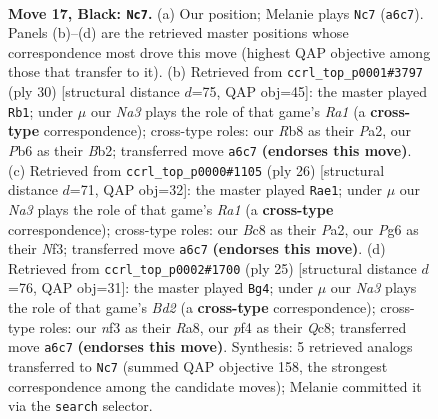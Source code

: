 \documentclass[11pt]{article}
\begin{document}
\begin{figure}[p]\centering
\begin{subfigure}{0.46\textwidth}\centering
\resizebox{\linewidth}{!}{%
\newchessgame
\chessboard[
  setfen={1rbq1r1k/p3b2p/npp2np1/3p1p2/3P1P2/P4NP1/QP1NP1BP/R1B1R1K1 b - - 3 17},
  showmover=false,
  pgfstyle=straightmove, color=movearrow, markmove={a6-c7}
]}
\caption{}
\end{subfigure}\hfill
\begin{subfigure}{0.46\textwidth}\centering
\resizebox{\linewidth}{!}{%
\newchessgame
\chessboard[
  setfen={r2qr1k1/p4pbn/2pp1np1/5b1p/2PPp3/2N1P2P/PB1NBPP1/R2QR1K1 w - - 2 16},
  showmover=false,
  pgfstyle=straightmove, color=movearrow, markmove={a1-b1}
]}
\caption{}
\end{subfigure}
\\[4pt]
\begin{subfigure}{0.46\textwidth}\centering
\resizebox{\linewidth}{!}{%
\newchessgame
\chessboard[
  setfen={r1b1r1k1/pp1nqp1p/3p1np1/2pP4/2P5/2NBPN1P/PPQ3P1/R4RK1 w - - 3 14},
  showmover=false,
  pgfstyle=straightmove, color=movearrow, markmove={a1-e1}
]}
\caption{}
\end{subfigure}\hfill
\begin{subfigure}{0.46\textwidth}\centering
\resizebox{\linewidth}{!}{%
\newchessgame
\chessboard[
  setfen={r1q2rk1/1ppb1pb1/2np1npp/4p3/1PP5/1QNP1NP1/4PPBP/1RB2RK1 b - - 1 13},
  showmover=false,
  pgfstyle=straightmove, color=movearrow, markmove={d7-g4}
]}
\caption{}
\end{subfigure}
\caption{\textbf{Move 17, Black: \texttt{Nc7}.} (a) Our position; Melanie plays \texttt{Nc7} (\texttt{a6c7}). Panels (b)--(d) are the retrieved master positions whose correspondence most drove this move (highest QAP objective among those that transfer to it). (b) Retrieved from \texttt{ccrl\_top\_p0001\#3797} (ply 30) [structural distance $d$=75, QAP obj=45]: the master played \texttt{Rb1}; under $\mu$ our \emph{Na3} plays the role of that game's \emph{Ra1} (a \textbf{cross-type} correspondence); cross-type roles: our \emph{R}b8 as their \emph{P}a2, our \emph{P}b6 as their \emph{B}b2; transferred move \texttt{a6c7} \textbf{(endorses this move)}. (c) Retrieved from \texttt{ccrl\_top\_p0000\#1105} (ply 26) [structural distance $d$=71, QAP obj=32]: the master played \texttt{Rae1}; under $\mu$ our \emph{Na3} plays the role of that game's \emph{Ra1} (a \textbf{cross-type} correspondence); cross-type roles: our \emph{B}c8 as their \emph{P}a2, our \emph{P}g6 as their \emph{N}f3; transferred move \texttt{a6c7} \textbf{(endorses this move)}. (d) Retrieved from \texttt{ccrl\_top\_p0002\#1700} (ply 25) [structural distance $d$=76, QAP obj=31]: the master played \texttt{Bg4}; under $\mu$ our \emph{Na3} plays the role of that game's \emph{Bd2} (a \textbf{cross-type} correspondence); cross-type roles: our \emph{n}f3 as their \emph{R}a8, our \emph{p}f4 as their \emph{Q}c8; transferred move \texttt{a6c7} \textbf{(endorses this move)}. Synthesis: 5 retrieved analogs transferred to \texttt{Nc7} (summed QAP objective 158, the strongest correspondence among the candidate moves); Melanie committed it via the \texttt{search} selector.}
\label{fig:thought-m33}
\end{figure}
\end{document}
